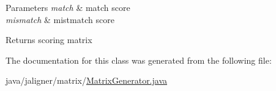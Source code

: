 \begin{DoxyParams}{Parameters}
{\em match} & match score \\
\hline
{\em mismatch} & mistmatch score\\
\hline
\end{DoxyParams}
\begin{DoxyReturn}{Returns}
scoring matrix 
\end{DoxyReturn}


The documentation for this class was generated from the following file\+:\begin{DoxyCompactItemize}
\item 
java/jaligner/matrix/\hyperlink{_matrix_generator_8java}{Matrix\+Generator.\+java}\end{DoxyCompactItemize}
